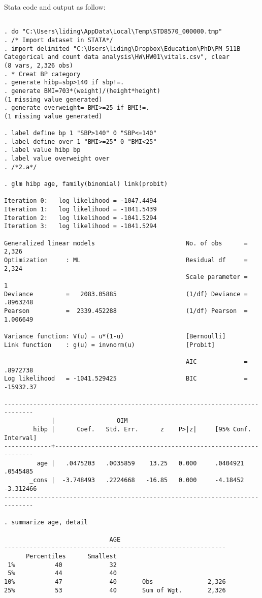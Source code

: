 \documentclass{article}
\begin{document}
Stata code and output as follow:
\begin{verbatim}

. do "C:\Users\liding\AppData\Local\Temp\STD8570_000000.tmp"
. /* Import dataset in STATA*/
. import delimited "C:\Users\liding\Dropbox\Education\PhD\PM 511B Categorical and count data analysis\HW\HW01\vitals.csv", clear
(8 vars, 2,326 obs)
. * Creat BP category
. generate hibp=sbp>140 if sbp!=.
. generate BMI=703*(weight)/(height*height)
(1 missing value generated)
. generate overweight= BMI>=25 if BMI!=.
(1 missing value generated)

. label define bp 1 "SBP>140" 0 "SBP<=140"
. label define over 1 "BMI>=25" 0 "BMI<25"
. label value hibp bp
. label value overweight over
. /*2.a*/

. glm hibp age, family(binomial) link(probit)

Iteration 0:   log likelihood = -1047.4494  
Iteration 1:   log likelihood = -1041.5439  
Iteration 2:   log likelihood = -1041.5294  
Iteration 3:   log likelihood = -1041.5294  

Generalized linear models                         No. of obs      =      2,326
Optimization     : ML                             Residual df     =      2,324
                                                  Scale parameter =          1
Deviance         =   2083.05885                   (1/df) Deviance =   .8963248
Pearson          =  2339.452288                   (1/df) Pearson  =   1.006649

Variance function: V(u) = u*(1-u)                 [Bernoulli]
Link function    : g(u) = invnorm(u)              [Probit]

                                                  AIC             =   .8972738
Log likelihood   = -1041.529425                   BIC             =  -15932.37

------------------------------------------------------------------------------
             |                 OIM
        hibp |      Coef.   Std. Err.      z    P>|z|     [95% Conf. Interval]
-------------+----------------------------------------------------------------
         age |   .0475203   .0035859    13.25   0.000     .0404921    .0545485
       _cons |  -3.748493   .2224668   -16.85   0.000     -4.18452   -3.312466
------------------------------------------------------------------------------

. summarize age, detail

                             AGE
-------------------------------------------------------------
      Percentiles      Smallest
 1%           40             32
 5%           44             40
10%           47             40       Obs               2,326
25%           53             40       Sum of Wgt.       2,326


\end{verbatim}
\end{document}
